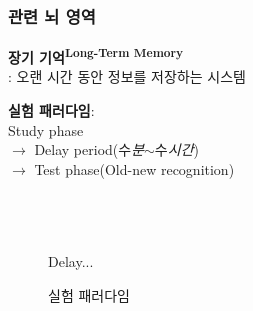 \documentclass{beamer}
\begin{document}
\subsubsection{관련 뇌 영역}
\begin{frame}{\textbf{장기 기억\textsuperscript{Long-Term Memory}}\\\large{: 오랜 시간 동안 정보를 저장하는 시스템}}
  \noindent
  \begin{minipage}{0.4\textwidth}
    \vspace{2em}
    \textbf{실험 패러다임}:\\
    Study phase \\$\rightarrow$ Delay period(수\textit{분}$\sim$수\textit{시간}) \\$\rightarrow$ Test phase(Old-new recognition)\\~\\~\\~\\
  \end{minipage}%
  \begin{minipage}{0.6\textwidth}
      \centering
      \begin{figure}
      \qquad
      Delay...
      \vspace{-0.5em}
      \caption{실험 패러다임}
    \end{figure}
  \end{minipage}\\
  \vspace{-2em}

\end{frame}
\end{document}
